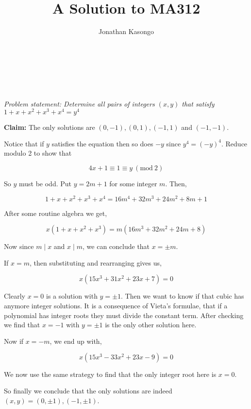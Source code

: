 \documentclass[11pt]{article}
\title{A Solution to MA312}
\author{Jonathan Kasongo}
\makeatletter
\renewcommand{\maketitle}{
    \begin{center}
        {\sffamily\bfseries\LARGE \@title} \\[1em]
        {\sffamily\large \@author} \\[1em]
        {\sffamily\large \thedate} \\[1em]
    \end{center}
    \vspace{1em}
}
\makeatother
\begin{document}
\maketitle

\textit{Problem statement: Determine all pairs of integers $(x,y)$ that satisfy $1+x+x^2+x^3+x^4 = y^4$} \vspace{0.2cm}

\noindent
{\sffamily \textbf{Claim:} The only solutions are $(0, -1), (0, 1), (-1, 1)$ and $(-1, -1)$.}

\noindent
Notice that if $y$ satisfies the equation then so does $-y$ since $y^4 = (-y)^4$. Reduce modulo 2 to show that

$$
4x + 1 \equiv 1 \equiv y \ (\text{mod} \ 2)
$$

\noindent
So $y$ must be odd. Put $y = 2m + 1$ for some integer $m$. Then,

$$
1+x+x^2+x^3+x^4 = 16m^4 + 32m^3 + 24m^2 + 8m + 1
$$

\noindent
After some routine algebra we get,

$$
x(1+x+x^2+x^3) = m(16m^3 + 32m^2 + 24m + 8)
$$

\noindent
Now since $m \mid x$ and $x \mid m$, we can conclude that $x = \pm m$.

\noindent
If $x=m$, then substituting and rearranging gives us,

$$
x(15x^3 + 31x^2 + 23x+ 7) = 0
$$

\noindent
Clearly $x=0$ is a solution with $y = \pm 1$. Then we want to know if that cubic has anymore integer solutions. It is a consequence of Vieta's formulae, that if a polynomial has integer roots they
must divide the constant term. After checking we find that $x=-1$ with $y=\pm 1$ is the only other solution here.

\noindent
Now if $x=-m$, we end up with,

$$
x(15x^3 -33x^2 + 23x - 9) = 0
$$

\noindent
We now use the same strategy to find that the only integer root here is $x=0$.

\vspace{0.5cm}

\noindent
So finally we conclude that the only solutions are indeed $(x, y) = (0, \pm 1), (-1, \pm 1)$.
\end{document}
